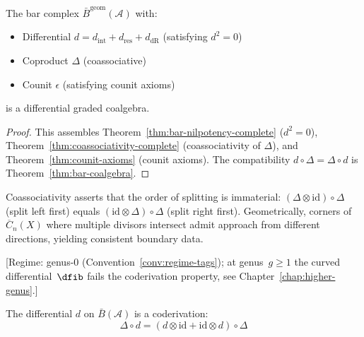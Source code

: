 \begin{corollary}\label{cor:bar-is-dgcoalg}
The bar complex $\bar{B}^{\text{geom}}(\mathcal{A})$ with:
\begin{itemize}
\item Differential $d = d_{\text{int}} + d_{\text{res}} + d_{\text{dR}}$ (satisfying $d^2 = 0$)
\item Coproduct $\Delta$ (coassociative)
\item Counit $\epsilon$ (satisfying counit axioms)
\end{itemize}
is a differential graded coalgebra.
\end{corollary}
\begin{proof}
This assembles Theorem~\ref{thm:bar-nilpotency-complete} ($d^2 = 0$), Theorem~\ref{thm:coassociativity-complete} (coassociativity of $\Delta$), and Theorem~\ref{thm:counit-axioms} (counit axioms). The compatibility $d \circ \Delta = \Delta \circ d$ is Theorem~\ref{thm:bar-coalgebra}.
\end{proof}

\begin{remark}\label{rem:coassoc-geometric}
Coassociativity asserts that the order of splitting is immaterial: $(\Delta \otimes \text{id}) \circ \Delta$ (split left first) equals $(\text{id} \otimes \Delta) \circ \Delta$ (split right first). Geometrically, corners of $\overline{C}_n(X)$ where multiple divisors intersect admit approach from different directions, yielding consistent boundary data.
\end{remark}

\begin{theorem}\label{thm:diff-is-coderivation}
\textup{[Regime: genus-$0$
\textup{(}Convention~\textup{\ref{conv:regime-tags})};
at genus~$g \geq 1$ the curved differential~$\dfib$ fails the
coderivation property, see
\textup{Chapter~\ref{chap:higher-genus}}.]}

The differential $d$ on $\bar{B}(\mathcal{A})$ is a coderivation:
\[\Delta \circ d = (d \otimes \text{id} + \text{id} \otimes d) \circ \Delta\]
\end{theorem}

